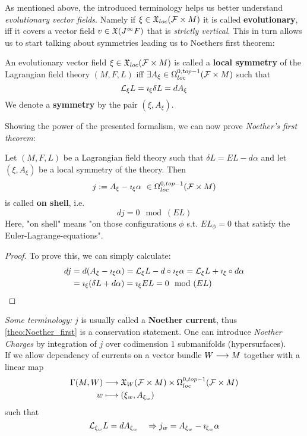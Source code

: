 As mentioned above, the introduced terminology helps us better understand \emph{evolutionary vector fields}. Namely if $\xi \in \mathfrak{X}_{loc}({\mathcal{F}} \times M)$ it is called \textbf{evolutionary}, iff it covers a vector field $v\in \mathfrak{X}(J^\infty F)$ that is \emph{strictly vertical}. This in turn allows us to start talking about symmetries leading us to   Noethers first theorem:

\begin{definition}
  An evolutionary vector field $\xi \in \mathfrak{X}_{loc}({\mathcal{F}} \times M)$ is called a \textbf{local symmetry} of the Lagrangian field theory $(M,F,L)$ iff $\exists A_\xi \in \Omega^{0,top-1}_{loc}({\mathcal{F}}\times M)$ such that
  $$ \mathcal{L}_{\xi} L = \imath_\xi \delta L = dA_\xi $$
  We denote a \textbf{symmetry} by the pair $(\xi, A_\xi)$.
\end{definition}

Showing the power of the presented formalism, we can now prove \emph{Noether's first theorem}:

\begin{theo}
\label{theo:Noether_first}
  Let $(M,F,L)$ be a Lagrangian field theory such that $\delta L = EL - d \alpha$ and let $(\xi, A_\xi)$ be a local symmetry of the theory. Then
  $$ j := A_\xi - \imath_\xi \alpha \ \in \Omega^{0,top-1}_{loc}({\mathcal{F}}\times M) $$
  is called \textbf{on shell}, i.e.
  $$d j = 0 \mod(EL)$$
  Here, "on shell" means "on those configurations $\phi$ s.t. $EL_\phi = 0$ that satisfy the Euler-Lagrange-equations".
\begin{proof}
  To prove this, we can simply calculate:
  \begin{align*}
    d j &= d(A_\xi - \imath_\xi \alpha) = \mathcal{L}_{\xi} L - d \circ \imath_\xi \alpha = \mathcal{L}_{\xi} L + \imath_\xi \circ d \alpha\\
    &= \imath_\xi (\delta L + d \alpha) = \imath_\xi EL = 0 \mod(EL)
  \end{align*}
\end{proof}
\end{theo}

\emph{Some terminology:} $j$ is usually called a \textbf{Noether current}, thus \ref{theo:Noether_first} is a conservation statement. One can introduce \emph{Noether Charges} by integration of $j$ over codimension $1$ submanifolds (hypersurfaces).\\

If we allow dependency of currents on a vector bundle $W\longrightarrow M$ together with a linear map
\begin{align*}
  \Gamma(M,W) &\longrightarrow \mathfrak{X}_{W}({\mathcal{F}}\times M) \times \Omega^{0,top-1}_{loc}({\mathcal{F}}\times M)\\
  w &\longmapsto (\xi_w, A_{\xi_w})
\end{align*}
such that
$$\mathcal{L}_{\xi_w}L = dA_{\xi_w} \quad \Rightarrow j_w = A_{\xi_w} - \imath_{\xi_w} \alpha$$

